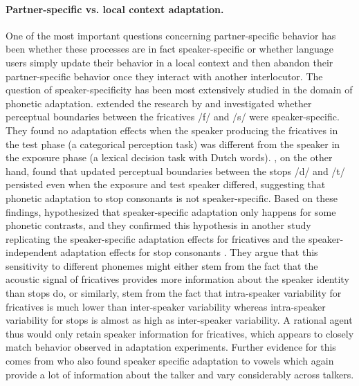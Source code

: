 \paragraph{Partner-specific vs. local context adaptation.} One of the most important questions concerning partner-specific behavior has been whether these processes are in fact
speaker-specific or whether language users simply update their behavior in a local context and then abandon their partner-specific behavior once they interact with another interlocutor.
The question of speaker-specificity has been most extensively studied in the domain of phonetic adaptation. \textcite{Eisner2005} extended the research by \textcite{Norris2003} and
investigated whether perceptual boundaries between the fricatives /f/ and /s/ were speaker-specific. They found no adaptation effects when the speaker producing the fricatives in the 
test phase (a categorical perception task) was different from the speaker in the exposure phase (a lexical decision task with Dutch words). \textcite{Kraljic2006}, 
on the other hand, found that updated perceptual boundaries between the stops /d/ and /t/ persisted even when the exposure and test speaker differed, suggesting that phonetic adaptation to stop consonants
is not speaker-specific.  Based on these findings, \citeauthor{Kraljic2006} hypothesized that speaker-specific adaptation only happens for some phonetic contrasts, and they confirmed this hypothesis
in another study replicating the speaker-specific adaptation effects for fricatives and the speaker-independent adaptation effects for stop consonants \cite{Kraljic2007}. They argue that 
this sensitivity to different phonemes might either stem from the fact that the acoustic signal of fricatives provides more information about the speaker identity than stops do, or similarly,
stem from the fact that intra-speaker variability for fricatives is much lower than inter-speaker variability whereas intra-speaker variability for stops is almost as high as inter-speaker variability.
A rational agent thus would only retain speaker information for fricatives, which appears to closely match behavior observed in adaptation experiments. Further evidence for this comes from \textcite{Trude2012}
who also found speaker specific adaptation to vowels which again provide a lot of information about the talker and vary considerably across talkers.

